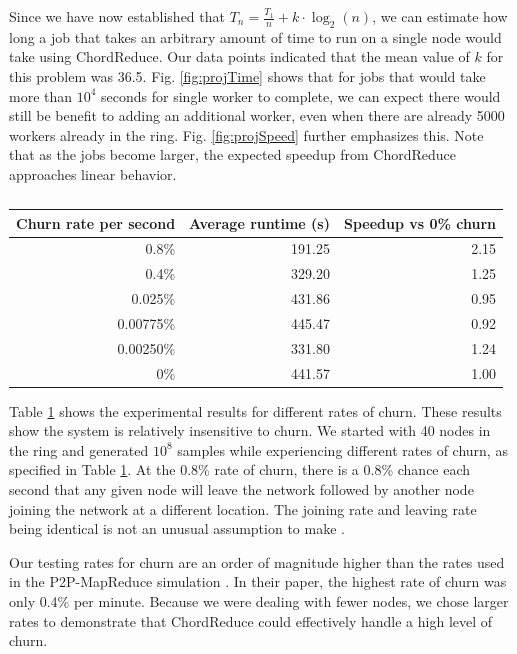 Since we have now established that $T_{n} = \frac{T_{1}}{n} + k \cdot \log_{2}(n)$, we can estimate how long a job that takes an arbitrary amount of time to run on a single node would take using ChordReduce.  Our data points indicated that the mean value of $k$ for this problem was 36.5.  Fig. \ref{fig:projTime} shows that for jobs that would take more than $10^{4}$ seconds for single worker to complete, we can expect there would still be benefit to adding an additional worker, even when there are already 5000 workers already in the ring.  Fig. \ref{fig:projSpeed} further emphasizes this. Note that as the jobs become larger, the expected speedup from ChordReduce  approaches linear behavior.


\begin{table}
	\centering
	\begin{tabular}{|r|r|r|} 
		\hline 
		Churn rate per second & Average runtime (s) & Speedup vs 0\% churn\\ \hline{}
		0.8\% & 191.25 & 2.15 \\ \hline
		0.4\% & 329.20 & 1.25 \\ \hline
		0.025\% & 431.86 & 0.95 \\ \hline 
		0.00775\%  & 445.47 & 0.92 \\ \hline 
		0.00250\% & 331.80  &  1.24 \\ \hline 
		0\% & 441.57 & 1.00 \\ \hline
	\end{tabular}
	\caption{} 
	\label{tab:churnSpeed}
\end{table}


Table \ref{tab:churnSpeed} shows the experimental results for different rates of churn. These results show the system  is relatively insensitive to churn.  We started with 40 nodes in the ring and generated $10^{8}$ samples while experiencing different rates of churn, as specified in Table \ref{tab:churnSpeed}.  At the 0.8\% rate of churn, there is a 0.8\% chance each second that any given node will leave the network followed by another node joining the network at a different location. The joining rate and leaving rate being identical is not an unusual assumption to make \cite{marozzo2012p2p} \cite{load}.  

Our testing rates for churn are an order of magnitude higher than the rates used in the P2P-MapReduce simulation  \cite{marozzo2012p2p}.  In their paper, the highest rate of churn was only 0.4\% per minute. Because we were dealing with fewer nodes, we chose larger rates to demonstrate that ChordReduce could effectively handle a high level of churn.  


